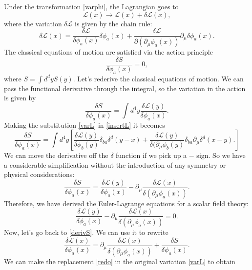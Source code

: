 \documentclass[main.tex]{subfiles}
\begin{document}
Under the transformation \ref{varphi}, the Lagrangian goes to 
\[
\mathcal{L}(x) \to \mathcal{L}(x) + \delta \mathcal{L}(x),
\]
where the variation $\delta \mathcal{L}$ is given by the chain rule:
\begin{equation} \label{varL}
\delta \mathcal{L} (x) = \frac{\delta \mathcal{L}}{\delta \phi_a (x)} \delta \phi_a (x) + \frac{\delta \mathcal{L}}{\partial (\partial_\mu \phi_a (x))} \partial_\mu \delta \phi_a (x).
\end{equation}
The classical equations of motion are satisfied via the action principle
\[
\frac{\delta S}{\delta \phi_a (x)} = 0,
\]
where $S = \int d^d y S(y)$. Let's rederive the classical equations of motion. We can pass the functional derivative through the integral, so the variation in the action is given by
\begin{equation} \label{insertL}
\frac{\delta S}{\delta \phi_a (x)} = \int d^4 y  \frac{\delta \mathcal{L} (y)}{\delta \phi_a (x)}.
\end{equation}
Making the substitution \ref{varL} in \ref{insertL} it becomes
\[
\frac{\delta S}{\delta \phi_a (x)} = \int d^4 y \left[
\frac{\delta \mathcal{L} (y)}{\delta \phi_b(y)} \delta_{ba} \delta^d (y-x) + \frac{\delta \mathcal{L}(y)}{\delta (\partial_\mu \phi_b (y)} \delta_{ba} \partial_\mu \delta^d (x - y).
\right]
\]
We can move the derivative off the $\delta$ function if we pick up a $-$ sign. So we have a considerable simplification without the introduction of any symmetry or physical considerations: 
\begin{equation} \label{derivS}
\frac{\delta S}{\delta \phi_a (x)} = \frac{\delta \mathcal{L} (y)}{\delta \phi_a (x)} - \partial_\mu \frac{\delta \mathcal{L} (x)}{\delta (\partial_\mu \phi_a (x))}.
\end{equation}
Therefore, we have derived the Euler-Lagrange equations for a scalar field theory:
\begin{equation} \label{elequation}
\frac{\delta\mathcal{L} (y)}{\delta \phi_a (x)} - \partial_\mu \frac{\delta \mathcal{L} (x)}{\delta (\partial_\mu \phi_a (x))} = 0.
\end{equation}
Now, let's go back to \ref{derivS}. We can use it to rewrite
\begin{equation} \label{redo}
\frac{\delta \mathcal{L}(x)}{\delta\phi_a (x)} = \partial_\mu \frac{\delta \mathcal{L} (x)}{\delta (\partial_\mu \phi_a (x))} + \frac{\delta S}{\delta \phi_a (x)}.
\end{equation}
We can make the replacement \ref{redo} in the original variation \ref{varL} to obtain
\end{document}
